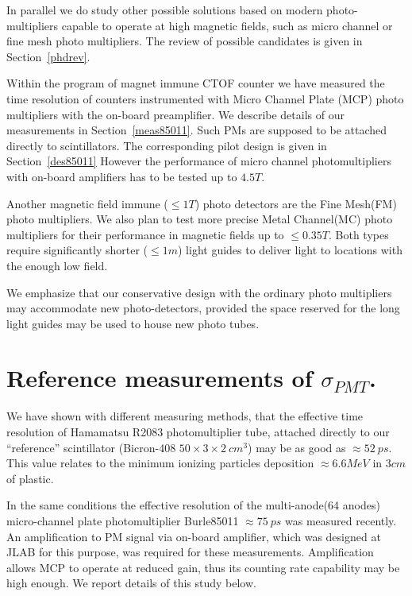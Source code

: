 In parallel we  do study  other possible solutions based on 
modern photo-multipliers  capable to operate at high magnetic fields, such as 
micro channel or fine mesh photo multipliers.
The review of possible candidates is given in Section~\ref{phdrev}.


Within the program of  magnet immune CTOF counter
 we have measured the time resolution of  counters instrumented with  
Micro Channel Plate (MCP) photo multipliers with the on-board preamplifier. 
We describe  details of our  measurements in  Section~\ref{meas85011}.
Such  PMs are supposed to  be attached directly to scintillators.  
The corresponding pilot design is given   in Section~\ref{des85011}
However the performance of micro channel photomultipliers with  on-board amplifiers has to be tested up to $4.5T$.

Another  magnetic field  immune ($\leq1T$) 
photo detectors are the  Fine Mesh(FM) photo multipliers. 
We also plan to test more precise  Metal Channel(MC) photo multipliers for their performance 
in magnetic fields up to $\leq0.35T$. 
 Both types   require significantly shorter ($\le1m$) light guides to deliver light to 
locations with the enough low field.

We emphasize that our conservative design with the ordinary photo multipliers may  accommodate 
new photo-detectors, provided the space reserved for the long light guides may be used to 
house  new photo tubes.


\newpage
\section{Reference measurements of $\sigma_{PMT}$.}
\label{measurements}
We have shown  with different measuring methods\cite{Baturin:2005},\cite{r1} 
that the effective time resolution of
Hamamatsu R2083 photomultiplier tube,
attached directly to our ``reference'' scintillator (Bicron-408 $50\times 3 \times 2~cm^3$) 
may be  as good as  $\approx52~ps$.  This value relates to  the minimum ionizing particles
deposition $\approx6.6MeV$ in $3cm$ of plastic. 

In the  same conditions  
the effective resolution of the 
multi-anode(64 anodes) micro-channel plate photomultiplier Burle85011
$\approx 75~ps$ was measured recently.    
An amplification to PM signal via on-board amplifier, 
which was designed at JLAB for this purpose, 
was required for these measurements.
Amplification  allows MCP to operate at reduced gain, 
thus its counting rate capability may be  high enough\cite{Baturin:2005}.
We report details of this study below.



